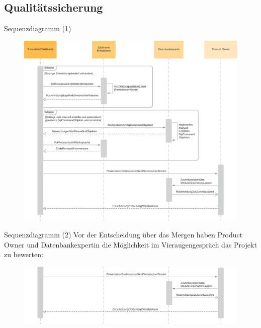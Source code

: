 \documentclass[toc]{beamer}
\begin{document}
    \subsection{Qualitätssicherung}
        \begin{frame}{Sequenzdiagramm (1)}
            \begin{figure}[htp]
                    \includegraphics[scale=0.12]{Einfaches Sequenzdiagramm_2.png}
                \end{figure}
        \end{frame}
        
        \begin{frame}{Sequenzdiagramm (2)}
            Vor der Entscheidung über das Mergen haben Product Owner und Datenbankexpertin die Möglichkeit im Vieraugengespräch das Projekt zu bewerten:
            \begin{figure}[htp]
                    \includegraphics[scale=0.12]{Einfaches Sequenzdiagramm_2_crop.png}
                \end{figure}
        \end{frame}
\end{document}
